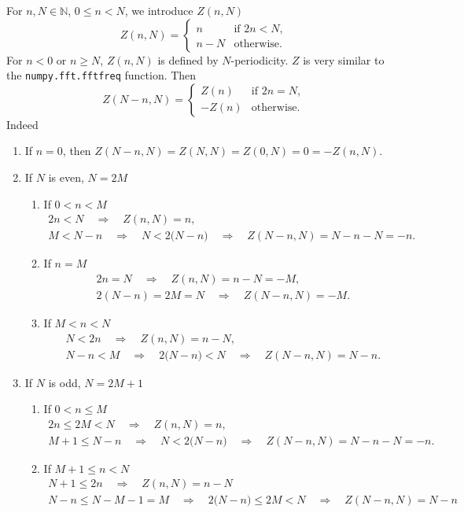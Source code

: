 \documentclass[draft, appendixprefix=true, chapterprefix=true, fontsize=12pt, numbers=noendperiod]{scrbook}
\newcommand{\naturals}{\mathbb N}
\begin{document}
For \(n, N\in\naturals\), \(0\leq n<N\), we introduce \(Z(n, N)\)
\begin{equation}
  Z(n, N)=
  \begin{cases}
    n & \text{if }2n<N,\\
    n-N & \text{otherwise.}
  \end{cases}
\end{equation}
For \(n<0\) or \(n\geq N\), \(Z(n, N)\) is defined by
\(N\)-periodicity. \(Z\) is very similar to the
\texttt{numpy.fft.fftfreq} function. Then
\begin{equation}
  Z(N-n, N)=
  \begin{cases}
    Z(n) & \text{if }2n=N,\\
    -Z(n) & \text{otherwise.}
  \end{cases}
\end{equation}
Indeed
\begin{enumerate}
\item If \(n=0\), then \(Z(N-n, N)=Z(N, N)=Z(0, N)=0=-Z(n, N)\).
\item If \(N\) is even, \(N=2M\)
  \begin{enumerate}
  \item If \(0<n<M\)
    \begin{gather*}
      2n<N\quad\Rightarrow\quad Z(n, N)=n,\\
      M<N-n\quad\Rightarrow\quad N<2\bigl(N-n\bigr)\quad\Rightarrow\quad Z(N-n, N)=N-n-N=-n.
    \end{gather*}
  \item If \(n=M\)
    \begin{gather*}
      2n=N\quad\Rightarrow\quad Z(n, N)=n-N=-M,\\
      2(N-n)=2M=N\quad\Rightarrow\quad Z(N-n, N)=-M.
    \end{gather*}
  \item If \(M<n<N\)
    \begin{gather*}
      N<2n\quad\Rightarrow\quad Z(n, N)=n-N,\\
     N-n<M\quad\Rightarrow\quad 2\bigl(N-n\bigr)<N\quad\Rightarrow\quad Z(N-n, N)=N-n.
    \end{gather*}
  \end{enumerate}
\item If \(N\) is odd, \(N=2M+1\)
  \begin{enumerate}
  \item If \(0<n\leq M\)
    \begin{gather*}
      2n\leq 2M<N\quad\Rightarrow\quad Z(n, N)=n,\\
      M+1\leq N-n\quad\Rightarrow\quad N<2\bigl(N-n\bigr)\quad\Rightarrow\quad Z(N-n, N)=N-n-N=-n.
    \end{gather*}
  \item If \(M+1\leq n<N\)
    \begin{gather*}
      N+1\leq 2n\quad\Rightarrow\quad Z(n, N)=n-N\\
      N-n\leq N-M-1=M\quad\Rightarrow\quad 2\bigl(N-n\bigr)\leq 2M<N\quad\Rightarrow\quad Z(N-n, N)=N-n
    \end{gather*}
  \end{enumerate}
\end{enumerate}
\end{document}
